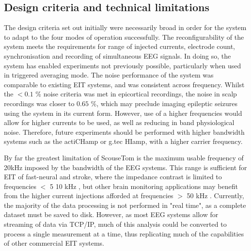 \subsection{Design criteria and technical limitations}
The design criteria set out initially were necessarily broad in order for the system to adapt to the four modes of operation successfully. The reconfigurability of the system meets the requirements for range of injected currents, electrode count, synchronisation and recording of simultaneous EEG signals. In doing so, the system has enabled experiments not previously possible, particularly when used in triggered averaging mode. The noise performance of the system was comparable to existing EIT systems, and was consistent across frequency. Whilst the  $<0.1$ \% noise criteria was met in epicortical recordings, the noise in scalp recordings was closer to $0.65$ \%, which may preclude imaging epileptic seizures using the system in its current form. However, use of a higher frequencies would allow for higher currents to be used, as well as reducing in band physiological noise. Therefore, future experiments should be performed with higher bandwidth systems such as the actiCHamp or g.tec HIamp, with a higher carrier frequency. 

By far the greatest limitation of ScouseTom is the maximum usable frequency of 20kHz imposed by the bandwidth of the EEG systems. This range is sufficient for EIT of fast-neural and stroke, where the impedance contrast is limited to frequencies $<$ 5 10 kHz \cite{Malone2014a,Aristovich_2016,Vongerichten_2016}, but other brain monitoring applications may benefit from the higher current injections afforded at frequencies $>$ 50 kHz \cite{Fabrizi_2006,fu2014use,Manwaring2013}. Currently, the majority of the data processing is not performed in "real time", as a complete dataset must be saved to disk. However, as most EEG systems allow for streaming of data via TCP/IP, much of this analysis could be converted to process a single measurement at a time, thus replicating much of the capabilities of other commercial EIT systems.